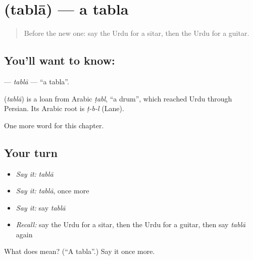 \section[\texorpdfstring{\ur{طبلہ} (tablā)}{طبلہ (tablā)}]{ (tablā) — a tabla}

\label{lesson:UR-C254-tabla}



\begin{quote}
Before the new one: say the Urdu for a sitar, then the Urdu for a guitar.
\end{quote}

\subsection*{You'll want to know: }
\textbf{} — \emph{tablā} — \textquotedblleft{}a tabla\textquotedblright{}.

\begin{cousinweb}
\textbf{} (\emph{tablā}) is a loan from Arabic \emph{ṭabl}, \textquotedblleft{}a drum\textquotedblright{}, which reached Urdu through Persian. Its Arabic root is \emph{ṭ-b-l} (Lane).
\end{cousinweb}

\begin{grammarlens}[title={What you've built}]
One more word for this chapter.
\end{grammarlens}

\subsection*{Your turn}
\begin{itemize}
\raggedright
  \item \emph{Say it:} \emph{tablā}
  \item \emph{Say it:} \emph{tablā}, once more
  \item \emph{Say it:} say \emph{tablā}
  \item \emph{Recall:} say the Urdu for a sitar, then the Urdu for a guitar, then say \emph{tablā} again
\end{itemize}

\begin{tcolorbox}[breakable,colback=teal!4,colframe=teal!35!black,title={Before you move on}]
What does  mean? (\textquotedblleft{}A tabla\textquotedblright{}.) Say it once more.
\end{tcolorbox}
